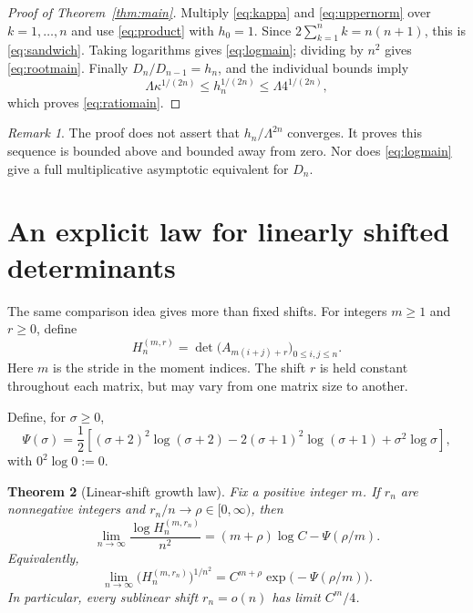 \documentclass[11pt,a4paper]{article}
\numberwithin{equation}{section}
\newtheorem{theorem}{Theorem}[section]
\theoremstyle{remark}\newtheorem{remark}[theorem]{Remark}
\begin{document}
\begin{proof}[Proof of Theorem~\ref{thm:main}]
Multiply \eqref{eq:kappa} and \eqref{eq:uppernorm} over $k=1,\ldots,n$ and
use \eqref{eq:product} with $h_0=1$. Since $2\sum_{k=1}^n k=n(n+1)$, this
is \eqref{eq:sandwich}. Taking logarithms gives \eqref{eq:logmain}; dividing
by $n^2$ gives \eqref{eq:rootmain}. Finally $D_n/D_{n-1}=h_n$, and the
individual bounds imply
\[
 \Lambda\kappa^{1/(2n)}\leq h_n^{1/(2n)}\leq\Lambda4^{1/(2n)},
\]
which proves \eqref{eq:ratiomain}.
\end{proof}

\begin{remark}
The proof does not assert that $h_n/\Lambda^{2n}$ converges. It proves this
sequence is bounded above and bounded away from zero. Nor does
\eqref{eq:logmain} give a full multiplicative asymptotic equivalent for $D_n$.
\end{remark}

\section{An explicit law for linearly shifted determinants}
\label{sec:shifts}
The same comparison idea gives more than fixed shifts. For integers $m\geq1$
and $r\geq0$, define
\begin{equation}\label{eq:shiftdef}
 H_n^{(m,r)}=\det\bigl(A_{m(i+j)+r}\bigr)_{0\leq i,j\leq n}.
\end{equation}
Here $m$ is the stride in the moment indices. The shift $r$ is held constant
throughout each matrix, but may vary from one matrix size to another.

Define, for $\sigma\geq0$,
\begin{equation}\label{eq:Psi}
 \Psi(\sigma)=\frac12\left[
 (\sigma+2)^2\log(\sigma+2)-2(\sigma+1)^2\log(\sigma+1)
 +\sigma^2\log\sigma\right],
\end{equation}
with $0^2\log0:=0$.

\begin{theorem}[Linear-shift growth law]\label{thm:shift}
Fix a positive integer $m$. If $r_n$ are nonnegative integers and
$r_n/n\to\rho\in[0,\infty)$, then
\begin{equation}\label{eq:shiftlaw}
 \lim_{n\to\infty}\frac{\log H_n^{(m,r_n)}}{n^2}
 =(m+\rho)\log C-\Psi(\rho/m).
\end{equation}
Equivalently,
\[
 \lim_{n\to\infty}\bigl(H_n^{(m,r_n)}\bigr)^{1/n^2}
 =C^{m+\rho}\exp\bigl(-\Psi(\rho/m)\bigr).
\]
In particular, every sublinear shift $r_n=o(n)$ has limit $C^m/4$.
\end{theorem}
\end{document}
